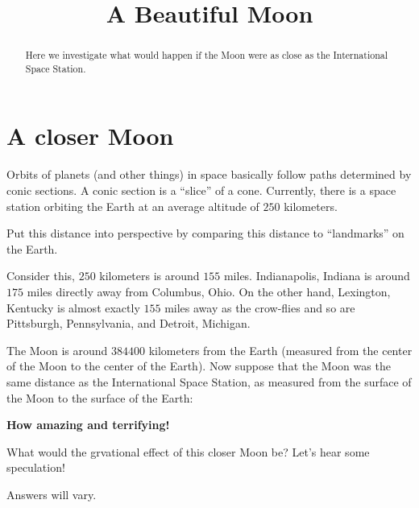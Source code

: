 \documentclass{ximera}
\title{A Beautiful Moon}
\begin{document}
\begin{abstract}
Here we investigate what would happen if the Moon were as close as the
International Space Station.
\end{abstract}
\maketitle

\section{A closer Moon}

Orbits of planets (and other things) in space basically follow paths
determined by conic sections. A conic section is a ``slice'' of a
cone. Currently, there is a space station orbiting the Earth at an average
altitude of $250$ kilometers.

\begin{question}
Put this distance into perspective by comparing this distance to
``landmarks'' on the Earth.
\begin{solution}
\begin{freeResponse}
Consider this, $250$ kilometers is around $155$ miles. Indianapolis,
Indiana is around $175$ miles directly away from Columbus, Ohio. On
the other hand, Lexington, Kentucky is almost exactly $155$ miles away
as the crow-flies and so are Pittsburgh, Pennsylvania, and Detroit,
Michigan.
\end{freeResponse}
\end{solution}
\end{question}

The Moon is around $384400$ kilometers from the Earth (measured from
the center of the Moon to the center of the Earth). Now suppose that
the Moon was the same distance as the International Space Station, as
measured from the surface of the Moon to the surface of the Earth:

\begin{center}
\textbf{How amazing and terrifying!}
\end{center}

\begin{question}
What would the grvational effect of this closer Moon be? Let's hear some speculation!
\begin{freeResponse}
Answers will vary. 
\end{freeResponse}
\end{question}
\end{document}
